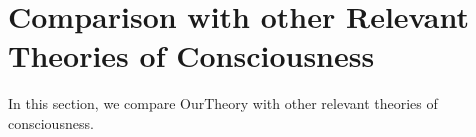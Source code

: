 \documentclass[utf8]{article}
\begin{document}
    
    
    \section{Comparison with other Relevant Theories of Consciousness}\label{sec:Comparison with other theories}
    In this section, we compare \ac{OurTheory} with other relevant theories of consciousness.
	
	
\end{document}
